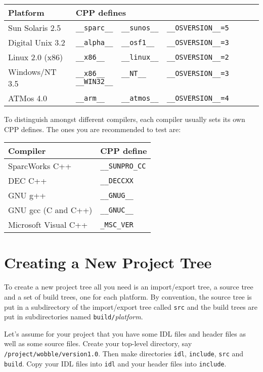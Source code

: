 \documentclass[11pt,twoside,onecolumn]{article}
\begin{document}
\begin{flushleft}
\begin{tabular}{|l|l|}
\hline
Platform & CPP defines \\
\hline
Sun Solaris 2.5  & \verb|__sparc__  __sunos__  __OSVERSION__=5| \\
\hline
Digital Unix 3.2 & \verb|__alpha__  __osf1__   __OSVERSION__=3| \\
\hline
Linux 2.0 (x86)  & \verb|__x86__    __linux__  __OSVERSION__=2| \\
\hline
Windows/NT 3.5   & \verb|__x86__    __NT__     __OSVERSION__=3  __WIN32__| \\
\hline
ATMos 4.0        & \verb|__arm__    __atmos__  __OSVERSION__=4| \\
\hline
\end{tabular}
\end{flushleft}

To distinguish amongst different compilers, each compiler usually sets its own
CPP defines.  The ones you are recommended to test are:

\begin{flushleft}
\begin{tabular}{|l|l|}
\hline
Compiler & CPP define \\
\hline
SparcWorks C++       & \verb|__SUNPRO_CC| \\
\hline
DEC C++              & \verb|__DECCXX| \\
\hline
GNU g++              & \verb|__GNUG__| \\
\hline
GNU gcc (C and C++)  & \verb|__GNUC__| \\
\hline
Microsoft Visual C++ & \verb|_MSC_VER| \\
\hline
\end{tabular}
\end{flushleft}



\section{Creating a New Project Tree}

To create a new project tree all you need is an import/export tree, a source
tree and a set of build trees, one for each platform.  By convention, the
source tree is put in a subdirectory of the import/export tree called {\tt src}
and the build trees are put in subdirectories named {\tt build/}{\it platform}.

Let's assume for your project that you have some IDL files and header files as
well as some source files.  Create your top-level directory, say {\small \tt
/project/wobble/version1.0}.  Then make directories {\tt idl}, {\tt include},
{\tt src} and {\tt build}.  Copy your IDL files into {\tt idl} and your header
files into {\tt include}.
\end{document}

